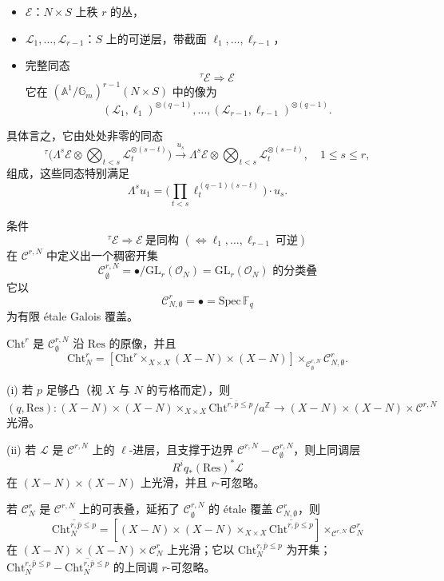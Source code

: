 \begin{itemize}
\item $\mathcal{E}$：$N\times S$ 上秩 $r$ 的丛，
\item {}$\mathcal{L}_{1},\ldots,\mathcal{L}_{r-1}$：$S$ 上的可逆层，带截面 $\ell_{1},\ldots,\ell_{r-1}$，
\item 完整同态
\[
{}^{\tau}\mathcal{E}\Rightarrow\mathcal{E}
\]
它在 $(\mathbb{A}^{1}/\mathbb{G}_{m})^{r-1}(N\times S)$ 中的像为
\[
(\mathcal{L}_{1},\ell_{1})^{\otimes(q-1)},\ldots,(\mathcal{L}_{r-1},\ell_{r-1})^{\otimes(q-1)}.
\]
\end{itemize}

具体言之，它由处处非零的同态
\[
{}^{\tau}\Big(\Lambda^{s}\mathcal{E}\otimes\bigotimes_{t<s}\mathcal{L}_{t}^{\otimes(s-t)}\Big)\xrightarrow{u_{s}}\Lambda^{s}\mathcal{E}\otimes\bigotimes_{t<s}\mathcal{L}_{t}^{\otimes(s-t)},\quad 1\le s\le r,
\]
组成，这些同态特别满足
\[
\Lambda^{s}u_{1}=\Big(\prod_{t<s}\ell_{t}^{(q-1)(s-t)}\Big)\cdot u_{s}.
\]

条件
\[
{}^{\tau}\mathcal{E}\Rightarrow\mathcal{E}\ \text{是同构 }(\Leftrightarrow\ell_{1},\ldots,\ell_{r-1}\ \text{可逆})
\]
在 $\mathcal{C}^{r,N}$ 中定义出一个稠密开集
\[
\mathcal{C}^{r,N}_{\emptyset}=\bullet/\mathrm{GL}_{r}(\mathcal{O}_{N})=\text{$\mathrm{GL}_{r}(\mathcal{O}_{N})$ 的分类叠}
\]
它以
\[
\mathcal{C}^{r}_{N,\emptyset}=\bullet=\mathrm{Spec}\,\mathbb{F}_{q}
\]
为有限 étale Galois 覆盖。

$\mathrm{Cht}^{r}$ 是 $\mathcal{C}^{r,N}_{\emptyset}$ 沿 $\mathrm{Res}$ 的原像，并且
\[
\mathrm{Cht}^{r}_{N}=[\mathrm{Cht}^{r}\times_{X\times X}(X-N)\times(X-N)]\times_{\mathcal{C}^{r,N}_{\emptyset}}\mathcal{C}^{r}_{N,\emptyset}.
\]

\begin{theorem*}
(i) 若 $p$ 足够凸（视 $X$ 与 $N$ 的亏格而定），则
\[
(q,\mathrm{Res}):(X-N)\times(X-N)\times_{X\times X}\overline{\mathrm{Cht}^{r,\bar{p}\le p}}/a^{\mathbb{Z}}\to(X-N)\times(X-N)\times\mathcal{C}^{r,N}
\]
光滑。

(ii) 若 $\mathcal{L}$ 是 $\mathcal{C}^{r,N}$ 上的 $\ell$-进层，且支撑于边界 $\mathcal{C}^{r,N}-\mathcal{C}^{r,N}_{\emptyset}$，则上同调层
\[
R^{i}q_{*}(\mathrm{Res})^{*}\mathcal{L}
\]
在 $(X-N)\times(X-N)$ 上光滑，并且 $r$-可忽略。
\end{theorem*}

\begin{corollary*}
若 $\mathcal{C}^{r}_{N}$ 是 $\mathcal{C}^{r,N}$ 上的可表叠，延拓了 $\mathcal{C}^{r,N}_{\emptyset}$ 的 étale 覆盖 $\mathcal{C}^{r}_{N,\emptyset}$，则
\[
\overline{\mathrm{Cht}^{r,\bar{p}\le p}_{N}}=[(X-N)\times(X-N)\times_{X\times X}\overline{\mathrm{Cht}^{r,\bar{p}\le p}}]\times_{\mathcal{C}^{r,N}}\mathcal{C}^{r}_{N}
\]
在 $(X-N)\times(X-N)\times\mathcal{C}^{r}_{N}$ 上光滑；它以 $\mathrm{Cht}^{r,\bar{p}\le p}_{N}$ 为开集；$\mathrm{Cht}^{r,\bar{p}\le p}_{N}-\overline{\mathrm{Cht}^{r,\bar{p}\le p}_{N}}$ 的上同调 $r$-可忽略。
\end{corollary*}

